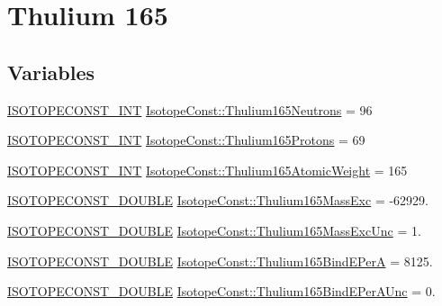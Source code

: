 \hypertarget{group___isotope_const-_thulium-_tm165}{}\section{Thulium 165}
\label{group___isotope_const-_thulium-_tm165}
\subsection*{Variables}
\begin{DoxyCompactItemize}
\item 
\mbox{\hyperlink{group___isotope_const-_macros_ga5f18360b3e99483a35c32d789e62621c}{I\+S\+O\+T\+O\+P\+E\+C\+O\+N\+S\+T\+\_\+\+I\+NT}} \mbox{\hyperlink{group___isotope_const-_thulium-_tm165_ga4d381314182f57e61365e37e5a0a3836}{Isotope\+Const\+::\+Thulium165\+Neutrons}} = 96
\item 
\mbox{\hyperlink{group___isotope_const-_macros_ga5f18360b3e99483a35c32d789e62621c}{I\+S\+O\+T\+O\+P\+E\+C\+O\+N\+S\+T\+\_\+\+I\+NT}} \mbox{\hyperlink{group___isotope_const-_thulium-_tm165_ga62d92e4e7fdba025ee1ea17b0305be74}{Isotope\+Const\+::\+Thulium165\+Protons}} = 69
\item 
\mbox{\hyperlink{group___isotope_const-_macros_ga5f18360b3e99483a35c32d789e62621c}{I\+S\+O\+T\+O\+P\+E\+C\+O\+N\+S\+T\+\_\+\+I\+NT}} \mbox{\hyperlink{group___isotope_const-_thulium-_tm165_ga341474512ffa8ecc940491d9fc982825}{Isotope\+Const\+::\+Thulium165\+Atomic\+Weight}} = 165
\item 
\mbox{\hyperlink{group___isotope_const-_macros_ga8f45a7272ce02c0b4c65c44636ed719a}{I\+S\+O\+T\+O\+P\+E\+C\+O\+N\+S\+T\+\_\+\+D\+O\+U\+B\+LE}} \mbox{\hyperlink{group___isotope_const-_thulium-_tm165_ga828df10ff671abb15a02335dacbb1605}{Isotope\+Const\+::\+Thulium165\+Mass\+Exc}} = -\/62929.
\item 
\mbox{\hyperlink{group___isotope_const-_macros_ga8f45a7272ce02c0b4c65c44636ed719a}{I\+S\+O\+T\+O\+P\+E\+C\+O\+N\+S\+T\+\_\+\+D\+O\+U\+B\+LE}} \mbox{\hyperlink{group___isotope_const-_thulium-_tm165_ga09de70b081506450d6dc77dcded2a708}{Isotope\+Const\+::\+Thulium165\+Mass\+Exc\+Unc}} = 1.
\item 
\mbox{\hyperlink{group___isotope_const-_macros_ga8f45a7272ce02c0b4c65c44636ed719a}{I\+S\+O\+T\+O\+P\+E\+C\+O\+N\+S\+T\+\_\+\+D\+O\+U\+B\+LE}} \mbox{\hyperlink{group___isotope_const-_thulium-_tm165_ga4d3e2ec8f20f646f0b15ada5ecb2e61d}{Isotope\+Const\+::\+Thulium165\+Bind\+E\+PerA}} = 8125.
\item 
\mbox{\hyperlink{group___isotope_const-_macros_ga8f45a7272ce02c0b4c65c44636ed719a}{I\+S\+O\+T\+O\+P\+E\+C\+O\+N\+S\+T\+\_\+\+D\+O\+U\+B\+LE}} \mbox{\hyperlink{group___isotope_const-_thulium-_tm165_ga1f9777aa6637fdf54f400da4410bf72d}{Isotope\+Const\+::\+Thulium165\+Bind\+E\+Per\+A\+Unc}} = 0.

\end{DoxyCompactItemize}
